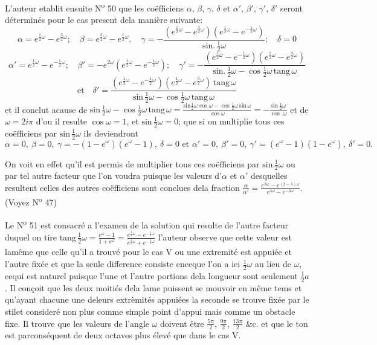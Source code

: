 \documentclass[11pt,a4paper]{article}
\begin{document}
L'auteur etablit ensuite N\textsuperscript{o} 50 que les coëfficiens $\alpha$, $\beta$, $\gamma$, $\delta$ et
$\alpha'$, $\beta'$, $\gamma'$, $\delta'$ seront déterminés pour le cas present dela manière suivante:
\[ \alpha=e^{\frac{1}{2}\omega}-e^{\frac{3}{2}\omega};\quad \beta=e^{\frac{3}{2}\omega}-e^{\frac{1}{2}\omega},\quad \gamma=-\frac{(e^{\frac{1}{2}\omega}-e^{\frac{3}{2}\omega})(e^{\frac{1}{2}\omega}-e^{-\frac{1}{2}\omega})}{\text{sin.}\,\frac{1}{2}\omega};\quad \delta=0 \]
\[ \alpha'=e^{\frac{1}{2}\omega}-e^{-\frac{1}{2}\omega};\quad \beta'=-e^{2\omega}(e^{\frac{1}{2}\omega}-e^{-\frac{1}{2}\omega});\quad \gamma'=-\frac{(e^{\frac{1}{2}\omega}-e^{-\frac{1}{2}\omega})(e^{\frac{1}{2}\omega}-e^{\frac{3}{2}\omega})}{\text{sin.}\,\frac{1}{2}\omega-\cos\frac{1}{2}\omega\,\text{tang}\,\omega} \]
\[ \text{et}\quad \delta'=\frac{(e^{\frac{1}{2}\omega}-e^{-\frac{1}{2}\omega})(e^{\frac{1}{2}\omega}-e^{\frac{3}{2}\omega})\,\text{tang}\,\omega}{\text{sin}\,\frac{1}{2}\omega-\cos\frac{1}{2}\omega\,\text{tang}\,\omega} \]
et il conclut acause de
$\text{sin}\,\frac{1}{2}\omega-\cos\frac{1}{2}\omega\,\text{tang}\,\omega=\frac{\text{sin}\frac{1}{2}\omega\cos\omega-\cos\frac{1}{2}\omega\,\text{sin}\,\omega}{\cos\omega}=-\frac{\text{sin}\,\frac{1}{2}\omega}{\cos.\omega}$
et de $\omega=2i\pi$ d'ou il resulte $\cos\omega=1$, et $\text{sin}\,\frac{1}{2}\omega=0$; que si on multiplie tous
ces coëfficiens par $\text{sin}\,\frac{1}{2}\omega$ ils deviendront
\[ \alpha=0,\ \beta=0,\ \gamma=-(1-e^{\omega})(e^{\omega}-1),\ \delta=0 \text{ et } \alpha'=0,\ \beta'=0,\ \gamma'=(e^{\omega}-1)(1-e^{\omega}),\ \delta'=0. \]

On voit en effet qu'il est permis de multiplier tous ces coëfficiens par $\text{sin}\,\frac{1}{2}\omega$
ou par tel autre facteur que l'on voudra puisque les valeurs d'$\alpha$ et $\alpha'$ desquelles
resultent celles des autres coëfficiens sont conclues dela fraction
$\frac{\alpha}{\alpha'}=\frac{e^{\lambda\omega}-e^{(2-\lambda)\omega}}{e^{\lambda\omega}-e^{-\lambda\omega}}$. (Voyez N\textsuperscript{o} 47)

Le N\textsuperscript{o} 51 est consacré a l'examen de la solution qui resulte de l'autre facteur
duquel on tire $\text{tang}\,\frac{1}{2}\omega=\frac{e^{\omega}-1}{1+e^{\omega}}=\frac{e^{\frac{1}{2}\omega}-e^{-\frac{1}{2}\omega}}{e^{\frac{1}{2}\omega}+e^{-\frac{1}{2}\omega}}$ l'auteur observe que cette
valeur est lamême que celle qu'il a trouvé pour le cas V ou une extremité est appuiée
et l'autre fixée et que la seule difference consiste enceque l'on a ici $\frac{1}{2}\omega$ au lieu
de $\omega$, cequi est naturel puisque l'une et l'autre portions dela longueur sont
seulement $\frac{1}{2}a$. Il conçoit que les deux moitiés dela lame puissent se mouvoir
en même tems et qu'ayant chacune une deleurs extrèmités appuiées la seconde
se trouve fixée par le stilet consideré non plus comme simple point d'appui mais
comme un obstacle fixe. Il trouve que les valeurs de l'angle $\omega$ doivent être
$\frac{5\pi}{2}$, $\frac{9\pi}{2}$, $\frac{13\pi}{2}$ \&c. et que le ton est parconséquent de deux octaves plus élevé
que dans le cas V.
\end{document}
